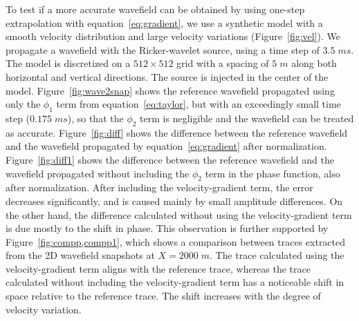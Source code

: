 
To test if a more accurate wavefield can be obtained by using one-step extrapolation with equation~\ref{eq:gradient}, we use a synthetic model with a smooth velocity distribution and large velocity variations (Figure~\ref{fig:vel}). We propagate a wavefield with the Ricker-wavelet source, using a time step of $3.5\;ms$. The model is discretized on a $512 \times 512$ grid with a spacing of $5\;m$ along both horizontal and vertical directions. The source is injected in the center of the model. Figure~\ref{fig:wave2snap} shows the reference wavefield propagated using only the $\phi_1$ term from equation~\ref{eq:taylor}, but with an exceedingly small time step ($0.175\;ms$), so that the $\phi_2$ term is negligible and the wavefield can be treated as accurate. Figure~\ref{fig:diff} shows the difference between the reference wavefield and the wavefield propagated by equation~\ref{eq:gradient} after normalization. Figure~\ref{fig:diff1} shows the difference between the reference wavefield and the wavefield propagated without including the $\phi_2$ term in the phase function, also after normalization. After including the velocity-gradient term, the error decreases significantly, and is caused mainly by small amplitude differences. On the other hand, the difference calculated without using the velocity-gradient term is due mostly to the shift in phase. This observation is further supported by Figure~\ref{fig:compp,compp1}, which shows a comparison between traces extracted from the 2D wavefield snapshots at $X=2000\;m$. The trace calculated using the velocity-gradient term aligns with the reference trace, whereas the trace calculated without including the velocity-gradient term has a noticeable shift in space relative to the reference trace. The shift increases with the degree of velocity variation.

